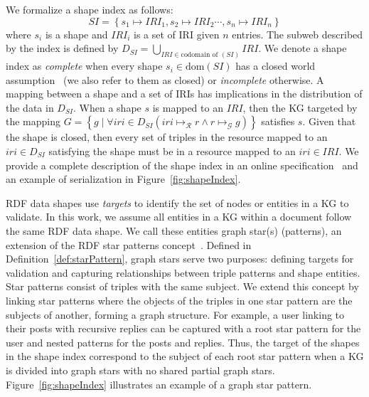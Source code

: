 We formalize a shape index as follows:
\begin{equation}\label{eq:shapeIndex}
   SI = \left\{ s_1 \mapsto IRI_1, s_2 \mapsto IRI_2 \cdots, s_n \mapsto IRI_n \right\}
\end{equation}
where $s_i$ is a shape and $IRI_i$ is a set of IRI given $n$ entries.
The subweb described by the index is defined by $D_{SI} = \bigcup_{IRI \in \text{codomain of }(SI)} IRI$.
We denote a shape index as \emph{complete} when every shape $s_i \in \text{dom}(SI)$ has a closed world assumption~\cite{Gayo2018b, Gayo2018} (we also refer to them as closed) or \emph{incomplete} otherwise.
A mapping between a shape and a set of IRIs has implications in the distribution of the data in $D_{SI}$.
When a shape $s$ is mapped to an $IRI$, then the KG targeted by the mapping $G = \left\{ g \mid \forall iri \in D_{SI} (iri \mapsto_{\mathcal{R}} r \land r \mapsto_{\mathcal{G}} g) \right\}$ satisfies $s$.
Given that the shape is closed, then every set of triples in the resource mapped to an $iri \in D_{SI}$ satisfying the shape must be in a resource mapped to an $iri \in IRI$.
We provide a complete description of the shape index in an online specification~ and an example of serialization in Figure~\ref{fig:shapeIndex}.

RDF data shapes use \emph{targets} to identify the set of nodes or entities in a KG to validate.  
In this work, we assume all entities in a KG within a document follow the same RDF data shape.  
We call these entities graph star(s) (patterns), an extension of the RDF star patterns concept~\cite{Karim2020}.  
Defined in Definition~\ref{def:starPattern}, graph stars serve two purposes:
defining targets for validation and capturing relationships between triple patterns and shape entities.  
Star patterns consist of triples with the same subject.
We extend this concept by linking star patterns where the objects of the triples in one star pattern are the subjects of another, forming a graph structure.
For example, a user linking to their posts with recursive replies can be captured with a root star pattern for the user and nested patterns for the posts and replies.  
Thus, the target of the shapes in the shape index correspond to the subject of each root star pattern when a KG is divided into graph stars with no shared partial graph stars.  
Figure~\ref{fig:shapeIndex} illustrates an example of a graph star pattern.


